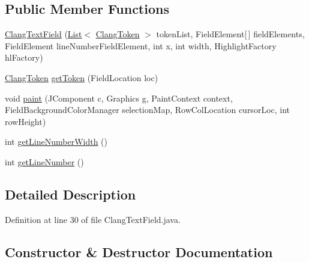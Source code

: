 \subsection*{Public Member Functions}
\begin{DoxyCompactItemize}
\item 
\mbox{\hyperlink{classghidra_1_1app_1_1decompiler_1_1component_1_1_clang_text_field_ab45b95d66a15bec7f0ffba0e77b5093c}{Clang\+Text\+Field}} (\mbox{\hyperlink{xml_8hh_ab5ab62f46b3735557c125f91b40ac155}{List}}$<$ \mbox{\hyperlink{classghidra_1_1app_1_1decompiler_1_1_clang_token}{Clang\+Token}} $>$ token\+List, Field\+Element\mbox{[}$\,$\mbox{]} field\+Elements, Field\+Element line\+Number\+Field\+Element, int x, int width, Highlight\+Factory hl\+Factory)
\item 
\mbox{\hyperlink{classghidra_1_1app_1_1decompiler_1_1_clang_token}{Clang\+Token}} \mbox{\hyperlink{classghidra_1_1app_1_1decompiler_1_1component_1_1_clang_text_field_a7c4539de6243e532d433b2a2deb13645}{get\+Token}} (Field\+Location loc)
\item 
void \mbox{\hyperlink{classghidra_1_1app_1_1decompiler_1_1component_1_1_clang_text_field_a78be5e487303649a4dde756c3e06c95c}{paint}} (J\+Component c, Graphics g, Paint\+Context context, Field\+Background\+Color\+Manager selection\+Map, Row\+Col\+Location cursor\+Loc, int row\+Height)
\item 
int \mbox{\hyperlink{classghidra_1_1app_1_1decompiler_1_1component_1_1_clang_text_field_afba7d93059347f885780270087d65537}{get\+Line\+Number\+Width}} ()
\item 
int \mbox{\hyperlink{classghidra_1_1app_1_1decompiler_1_1component_1_1_clang_text_field_a65931a7169f50132ca1b56ec4eb7dd4c}{get\+Line\+Number}} ()
\end{DoxyCompactItemize}


\subsection{Detailed Description}


Definition at line 30 of file Clang\+Text\+Field.\+java.



\subsection{Constructor \& Destructor Documentation}
\mbox{\label{classghidra_1_1app_1_1decompiler_1_1component_1_1_clang_text_field_ab45b95d66a15bec7f0ffba0e77b5093c}} 
